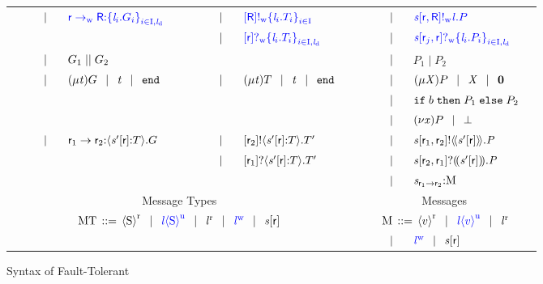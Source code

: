 \begin{figure}[t]
\begin{tabular}{|llclr|llclr|llclr|}
		& & \multirow{2}{*}{$ \sepTerms $} & \multirow{2}{*}{$ \textcolor{blue}{\GBranW{\Role}{\Role[R]}{\Set{ \Label_i.\GT_i }_{i \in \indexSet, \LabelD}}} $} & & & & $ \sepTerms $ & $ \textcolor{blue}{\LSelW{\Role[R]}{\Set{ \Label_i.\LT_i }_{i \in \indexSet}}} $ & & & & $ \sepTerms $ & $ \textcolor{blue}{\PSelW{\Chan}{\Role}{\Role[R]}{\Label}{P}} $ &\\
		&&&&& & & $ \sepTerms $ & $ \textcolor{blue}{\LBranW{\Role}{\Set{ \Label_i.\LT_i }_{i \in \indexSet, \LabelD}}} $ & & & & $ \sepTerms $ & $ \textcolor{blue}{\PBranW{\Chan}{\Role_j}{\Role}{\Set{ \Label_i.P_i }_{i \in \indexSet, \LabelD}}} $ &\\
		& & $ \sepTerms $ & $ \GPar{\GT_1}{\GT_2} $ & & &&&&& & & $ \sepTerms $ & $ P_1 \mid P_2 $ &\\
		& & $ \sepTerms $ & $ \GRep{\TypeV}{\GT} \sepTerms \TypeV \sepTerms \GEnd $ & & & & $ \sepTerms $ & $ \LRep{\TypeV}{\LT} \sepTerms \TypeV \sepTerms \LEnd $ & & & & $ \sepTerms $ & $ \PRep{\ProcV}{P} \sepTerms \ProcV \sepTerms \PEnd $ &\\
		&&&&& &&&&& & & $ \sepTerms $ & $ \PITE{\Expr[b]}{P_1}{P_2} $ &\\
		&&&&& &&&&& & & $ \sepTerms $ & $ \PRes{\Args}{P} \sepTerms \PCrash $ &\\
		& & \multirow{2}{*}{$ \sepTerms $} & \multirow{2}{*}{$ \GDel{\Role_1}{\Role_2}{\Chan'}{\Role}{\LT}{\GT} $} & & & & $ \sepTerms $ & $ \LDelA{\Role_2}{\Chan'}{\Role}{\LT}{\LT'} $ & & & & $ \sepTerms $ & $ \PDelA{\Chan}{\Role_1}{\Role_2}{\AT{\Chan'}{\Role}}{\PT} $ &\\
		&&&&& & & $ \sepTerms $ & $ \LDelB{\Role_1}{\Chan'}{\Role}{\LT}{\LT'} $ && & & $ \sepTerms $ & $ \PDelB{\Chan}{\Role_2}{\Role_1}{\AT{\Chan'}{\Role}}{\PT} $ &\\
		&&&&& &&&&& & & $ \sepTerms $ & $ \MQ{\Chan}{\Role_1}{\Role_2}{\Queue} $ &\\
		\hline
		\multicolumn{10}{|c|}{Message Types} & \multicolumn{5}{c|}{Messages}\\
		\multicolumn{10}{|c|}{\multirow{2}{*}{$ \MT \deffTerms \MessR{\Sort} \sepTerms \textcolor{blue}{\MessU{\Label}{\Sort}} \sepTerms \MessBR{\Label} \sepTerms \textcolor{blue}{\MessBW{\Label}} \sepTerms \AT{\Chan}{\Role} $}} & \multicolumn{5}{c|}{$ \; \Queue \deffTerms \MessR{\Expr[v]} \sepTerms \textcolor{blue}{\MessU{\Label}{\Expr[v]}} \sepTerms \MessBR{\Label} $}\\
		\multicolumn{10}{|c|}{} &&& $ \sepTerms $ & $ \textcolor{blue}{\MessBW{\Label}} \sepTerms \AT{\Chan}{\Role} $ &\\
		\hline
	\end{tabular}
	\caption{Syntax of Fault-Tolerant \MPST{}}
	\label{fig:syntax}
\end{figure}

